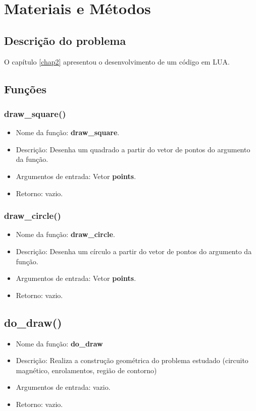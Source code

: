 \section{Materiais e Métodos}

\subsection{Descrição do problema}
O capítulo \ref{chap2} apresentou o desenvolvimento de um código em LUA.

\subsection{Funções}

\subsubsection*{draw\_square()}
\begin{itemize}
  \item Nome da função: \textbf{draw\_square}.
  \item Descrição: Desenha um quadrado a partir do vetor de pontos do argumento da função.
  \item Argumentos de entrada: Vetor \textbf{points}.
  \item Retorno: vazio.
\end{itemize}

\subsubsection*{draw\_circle()}
\begin{itemize}
  \item Nome da função: \textbf{draw\_circle}.
  \item Descrição: Desenha um círculo a partir do vetor de pontos do argumento da função.
  \item Argumentos de entrada: Vetor \textbf{points}.
  \item Retorno: vazio.
\end{itemize}

\subsection*{do\_draw()}
\begin{itemize}
  \item Nome da função: \textbf{do\_draw}
  \item Descrição: Realiza a construção geométrica do problema estudado (circuito magnético, enrolamentos, região de contorno)
  \item Argumentos de entrada: vazio.
  \item Retorno: vazio.
\end{itemize}

